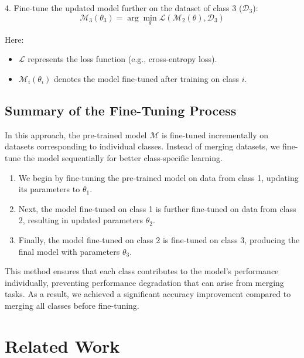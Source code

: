 \documentclass[conference]{IEEEtran}
\begin{document}
4. Fine-tune the updated model further on the dataset of class 3 (\( \mathcal{D}_3 \)):
\begin{equation}
\mathcal{M}_3(\theta_3) = \arg \min_{\theta} \mathcal{L}(\mathcal{M}_2(\theta), \mathcal{D}_3)
\end{equation}

Here:
\begin{itemize}
    \item \( \mathcal{L} \) represents the loss function (e.g., cross-entropy loss).
    \item \( \mathcal{M}_i(\theta_i) \) denotes the model fine-tuned after training on class \( i \).
\end{itemize}

\subsection*{Summary of the Fine-Tuning Process}
In this approach, the pre-trained model \( \mathcal{M} \) is fine-tuned incrementally on datasets corresponding to individual classes. Instead of merging datasets, we fine-tune the model sequentially for better class-specific learning.

\begin{enumerate}
    \item We begin by fine-tuning the pre-trained model on data from class 1, updating its parameters to \( \theta_1 \).
    \item Next, the model fine-tuned on class 1 is further fine-tuned on data from class 2, resulting in updated parameters \( \theta_2 \).
    \item Finally, the model fine-tuned on class 2 is fine-tuned on class 3, producing the final model with parameters \( \theta_3 \).
\end{enumerate}

This method ensures that each class contributes to the model's performance individually, preventing performance degradation that can arise from merging tasks. As a result, we achieved a significant accuracy improvement compared to merging all classes before fine-tuning.

\section{Related Work}
\end{document}
